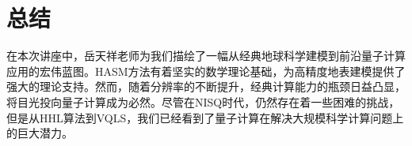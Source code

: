 \documentclass[12pt, a4paper]{article}
\begin{document}
\section{总结}

在本次讲座中，岳天祥老师为我们描绘了一幅从经典地球科学建模到前沿量子计算应用的宏伟蓝图。HASM方法有着坚实的数学理论基础，为高精度地表建模提供了强大的理论支持。然而，随着分辨率的不断提升，经典计算能力的瓶颈日益凸显，将目光投向量子计算成为必然。尽管在NISQ时代，仍然存在着一些困难的挑战，但是从HHL算法到VQLS，我们已经看到了量子计算在解决大规模科学计算问题上的巨大潜力。
\end{document}
